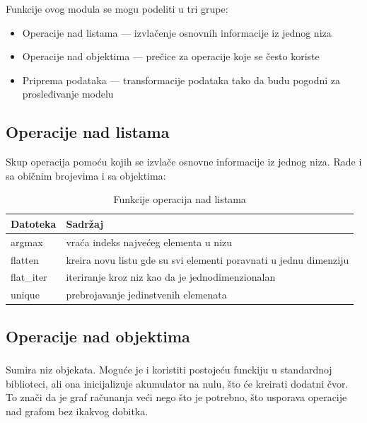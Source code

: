 \documentclass[11pt,a4paper]{article}
\newcommand{\code}[1]{\texttt{\detokenize{#1}}}
\begin{document}
Funkcije ovog modula se mogu podeliti u tri grupe:
\begin{itemize}
  \item Operacije nad listama --- izvlačenje osnovnih informacije iz jednog niza
  \item Operacije nad \code{Value} objektima --- prečice za operacije koje se
        često koriste
  \item Priprema podataka --- transformacije podataka tako da budu pogodni za
        prosleđivanje modelu
\end{itemize}

\subsection{Operacije nad listama}

Skup operacija pomoću kojih se izvlače osnovne informacije iz jednog niza. Rade
i sa običnim brojevima i sa \code{Value} objektima:

\begin{table}[H]
\begin{tabularx}{\textwidth}{>{\ttfamily}l X}
\toprule
\textrm{\textbf{Datoteka}} & \textbf{Sadržaj} \\
\midrule
  argmax & vraća indeks najvećeg elementa u nizu \\
  flatten & kreira novu listu gde su svi elementi poravnati u jednu dimenziju \\
  flat\_iter & iteriranje kroz niz kao da je jednodimenzionalan \\
  unique & prebrojavanje jedinstvenih elemenata \\
\bottomrule
\end{tabularx}
\caption{Funkcije operacija nad listama}
\end{table}

\subsection{Operacije nad  objektima}

\subsubsection{}

Sumira niz \code{Value} objekata. Moguće je i koristiti postojeću \code{sum}
funckiju u standardnoj biblioteci, ali ona inicijalizuje akumulator na nulu,
što će kreirati dodatni čvor. To znači da je graf računanja veći nego što je
potrebno, što usporava operacije nad grafom bez ikakvog dobitka.
\end{document}
